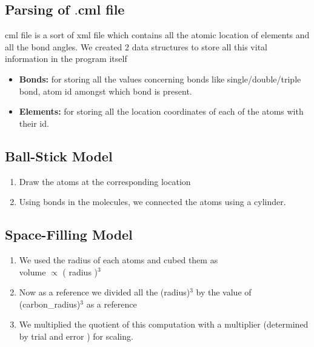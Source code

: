 \documentclass{report}
\begin{document}
\subsection*{Parsing of $.$cml file}
cml file is a sort of xml file which contains all the atomic location of elements and all the bond angles.
We created 2 data structures to store all this vital information in the program itself
\begin{itemize}
\item	\textbf{Bonds:} for storing all the values concerning bonds like single/double/triple bond, atom id amongst which bond is present.
\item	\textbf{Elements:} for storing all the location coordinates of each of the atoms with their id.
\end{itemize}
\subsection*{Ball-Stick Model}
\begin{enumerate}
\item	Draw the atoms at the corresponding location
\item	Using bonds in the molecules, we connected the atoms  using a cylinder.
\end{enumerate}
\subsection*{Space-Filling Model}
\begin{enumerate}


\item We used the radius of each atoms and cubed them as \\
volume $\propto$ ( radius )$^3$
\item Now as a reference we divided all the (radius)$^3$ by the value of (carbon\_radius)$^3$ as a reference
\item We multiplied the quotient of this computation with a multiplier (determined by trial and error ) for scaling.
\end{enumerate}
\end{document}
